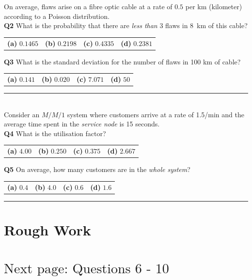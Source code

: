 \documentclass[12pt]{article}
\begin{document}
On average, flaws arise on a fibre optic cable at a rate of $0.5$ per km (kilometer) according to a Poisson distribution.\\[0.2cm]

{\bf Q2} What is the probability that there are \emph{less than} 3 flaws in 8~km of this cable? \\[0.2cm]
\begin{tabular}{cccc}
{\bf(a)} $0.1465$ & {\bf(b)} $0.2198$ & {\bf(c)} $0.4335$ & {\bf(d)} $0.2381$ \\[0.6cm]
\end{tabular}

{\bf Q3} What is the standard deviation for the number of flaws in 100 km of cable?\\[0.2cm]
\begin{tabular}{cccc}
{\bf(a)} $0.141$ & {\bf(b)} $0.020$ & {\bf(c)} $7.071$  & {\bf(d)} $50$ \\[0.6cm]
\end{tabular}



\rule{\linewidth}{1pt}
\quad\\
Consider an $M/M/1$ system where customers arrive at a rate of 1.5/min and the average time spent in the \emph{service node} is 15 seconds.\\[0.2cm]

{\bf Q4} What is the utilisation factor?\\[0.2cm]
\begin{tabular}{cccc}
{\bf(a)} $4.00$ & {\bf(b)} $0.250$ & {\bf(c)} $0.375$ & {\bf(d)} $2.667$ \\[0.6cm]
\end{tabular}

{\bf Q5} On average, how many customers are in the \emph{whole system}?\\[0.2cm]
\begin{tabular}{cccc}
{\bf(a)} $0.4$ & {\bf(b)} $4.0$ & {\bf(c)} $0.6$ & {\bf(d)} $1.6$ \\[0.6cm]
\end{tabular}

\rule{\linewidth}{1pt}

\newpage

\section*{Rough Work\\[23cm]}
\section*{\hspace{8cm}$\boxed{\text{Next page: Questions 6 - 10}}$}
\end{document}
